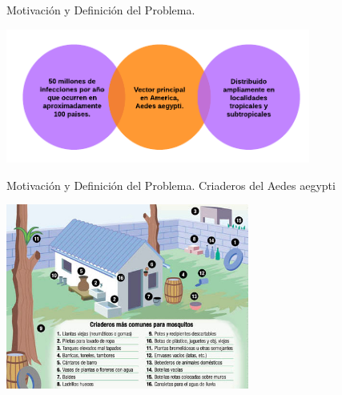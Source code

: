 \begin{frame}[t]{Motivación y Definición del Problema.}
  \begin{center}
    \includegraphics[width=10cm]{./graphics/dengue-intro.png}
  \end{center}
\end{frame}


\begin{frame}[t]{Motivación y Definición del Problema.  Criaderos del Aedes aegypti}
\begin{center}
    \includegraphics[width=8cm]{./graphics/criaderos.jpg}
    \end{center}
\end{frame}




